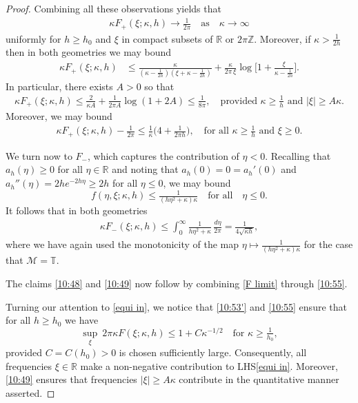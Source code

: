 \documentclass{amsart}
\newcommand{\R}{{\mathbb{R}}}
\newcommand{\T}{{\mathbb{T}}}
\newcommand{\Z}{{\mathbb{Z}}}
\theoremstyle{definition}
\theoremstyle{remark}
\begin{document}
\begin{proof}
Combining all these observations yields that 
\begin{align}\label{F limit}
\kappa F_+(\xi; \kappa,h)\longrightarrow \tfrac 1{2\pi} \quad\text{as}\quad \kappa\to \infty
\end{align}
uniformly for $h\geq h_0$ and $\xi$ in compact subsets of $\R$ or $2\pi \Z$. Moreover, if \(\kappa>\frac1{2h}\) then in both geometries we may bound
\begin{align*}
\kappa F_+(\xi;\kappa,h) &\leq \tfrac \kappa {(\kappa - \frac1{2h})(\xi+\kappa-\frac1{2h})} + \tfrac\kappa{2\pi\,\xi} \log\bigl[ 1 + \tfrac{\xi}{\kappa - \frac1{2h}} \bigr].
\end{align*}
In particular, there exists \(A>0\) so that
\begin{align}\label{10:53}
\kappa F_+(\xi;\kappa,h)\leq \tfrac 2{\kappa A} + \tfrac1{2\pi A}\log(1+2A)\leq \tfrac1{8\pi}, \quad\text{provided \(\kappa\geq \tfrac1h\) and \(|\xi|\geq A\kappa\)}.
\end{align}
Moreover, we may bound
\begin{align}\label{10:53'}
 \kappa F_+(\xi; \kappa,h) - \tfrac1{2\pi}
 \leq \tfrac1\kappa\bigl(4 + \tfrac1{2\pi h}\bigr), \quad\text{for all \(\kappa\geq \tfrac1h\) and \(\xi\geq0\)}.
\end{align}

We turn now to $F_-$, which captures the contribution of $\eta<0$. Recalling that $a_h(\eta)\geq 0$ for all $\eta\in\R$ and noting that \(a_h(0) = 0 = a_h'(0)\) and \(a_h''(\eta) = 2he^{-2h\eta}\geq 2h\) for all \(\eta\leq 0\), we may bound
\[
f(\eta,\xi;\kappa,h) \leq \tfrac1{(h\eta^2 + \kappa)\kappa} \quad \text{for all} \quad\eta\leq 0. 
\]
It follows that in both geometries
\begin{align}\label{10:55}
 \kappa F_-(\xi; \kappa,h) \leq \int_0^\infty \tfrac1{h\eta^2 + \kappa}\,\tfrac{d\eta}{2\pi} = \tfrac1{4\sqrt{\kappa h}},
\end{align}
where we have again used the monotonicity of the map \(\eta\mapsto \tfrac1{(h\eta^2 + \kappa)\kappa} \) for the case that \(\mathcal M = \T\).

The claims \eqref{10:48} and \eqref{10:49} now follow by combining \eqref{F limit} through \eqref{10:55}.

Turning our attention to \eqref{equi in}, we notice that
\eqref{10:53'} and \eqref{10:55} ensure that for all \(h\geq h_0\) we have
$$
\sup_\xi \ 2\pi\kappa F(\xi;\kappa,h) \leq 1 + C \kappa^{-1/2} \quad\text{for $\kappa\geq \tfrac1{h_0}$},
$$
provided $C = C(h_0)>0$ is chosen sufficiently large.  Consequently, all frequencies $\xi\in\R$ make a non-negative contribution to LHS\eqref{equi in}.  Moreover, \eqref{10:49} ensures that frequencies $|\xi|\geq A\kappa$ contribute in the quantitative manner asserted.
\end{proof}
\end{document}
